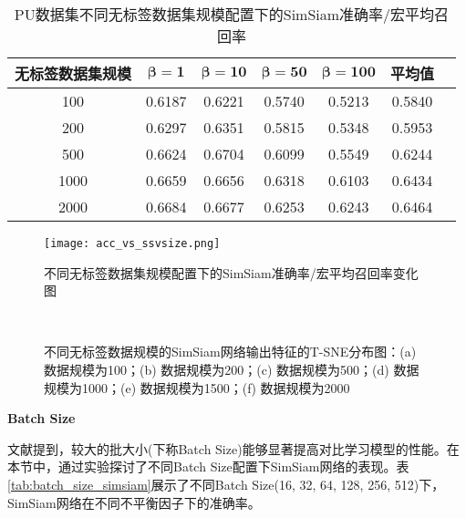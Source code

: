 \documentclass[master]{thesis-uestc}
\begin{document}
\begin{table}[h]
    \centering
    \caption{PU数据集不同无标签数据集规模配置下的SimSiam准确率/宏平均召回率}
    \begin{tabular}{ccccccc}
    \toprule
    无标签数据集规模 & $\boldsymbol{\beta=1}$ & $\boldsymbol{\beta=10}$ & $\boldsymbol{\beta=50}$ & $\boldsymbol{\beta=100}$ & \textbf{平均值} \\
    \midrule
    100   & 0.6187  & 0.6221 & 0.5740 & 0.5213 & 0.5840 \\
    200   & 0.6297  & 0.6351 & 0.5815 & 0.5348 & 0.5953 \\
    500   & 0.6624  & 0.6704 & 0.6099 & 0.5549 & 0.6244 \\
    1000  & 0.6659  & 0.6656 & 0.6318 & 0.6103 & 0.6434 \\
    2000  & 0.6684  & 0.6677 & 0.6253 & 0.6243 & 0.6464 \\
    \bottomrule
    \end{tabular}
    \label{tab:fine_tune_acc_ssv_size_pu}
\end{table}

\begin{figure}[h]
    \centering
    \texttt{[image: acc\_vs\_ssvsize.png]}
    \caption{不同无标签数据集规模配置下的SimSiam准确率/宏平均召回率变化图}
    \label{acc_vs_ssvsize}
\end{figure}


\begin{figure}[h]
    \centering
    \\
    
    \caption{不同无标签数据规模的SimSiam网络输出特征的T-SNE分布图：(a) 数据规模为100；(b) 数据规模为200；(c) 数据规模为500；(d) 数据规模为1000；(e) 数据规模为1500；(f) 数据规模为2000}
    \label{tsne_diff_ssv_size}
\end{figure}

\textbf{Batch Size}

文献\cite{chen2020simple}提到，较大的批大小(下称Batch Size)能够显著提高对比学习模型的性能。在本节中，通过实验探讨了不同Batch Size配置下SimSiam网络的表现。表\ref{tab:batch_size_simsiam}展示了不同Batch Size(16, 32, 64, 128, 256, 512)下，SimSiam网络在不同不平衡因子下的准确率。
\end{document}
